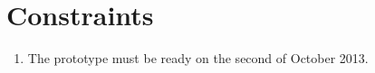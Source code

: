 \section{Constraints}
\begin{enumerate}
\item The prototype must be ready on the second of October 2013.
\end{enumerate}